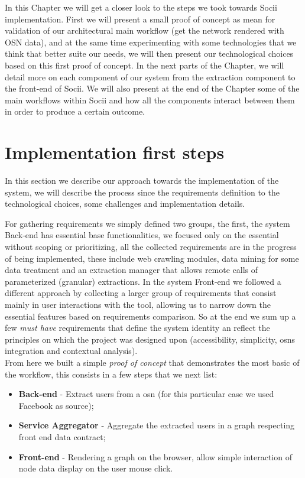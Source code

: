 In this Chapter we will get a closer look to the steps we took towards Socii implementation. First we will present a small proof of concept as mean for validation of our architectural main workflow (get the network rendered with OSN data), and at the same time experimenting with some technologies that we think that better suite our needs, we will then present our technological choices based on this first proof of concept.
\indent In the next parts of the Chapter, we will detail more on each component of our system from the extraction component to the front-end of Socii. We will also present at the end of the Chapter some of the main workflows within Socii and how all the components interact between them in order to produce a certain outcome.

\section{Implementation first steps}
In this section we describe our approach towards the implementation of the system, we will describe the process since the requirements
definition to the technological choices, some challenges and implementation details.

For gathering requirements we simply defined two groups, the first, the system Back-end has essential base functionalities, we focused only
on the essential without scoping or prioritizing, all the collected requirements are in the progress of being implemented, these include
web crawling modules, data mining for some data treatment and an extraction manager that allows remote calls of parameterized (granular) extractions.
In the system Front-end we followed a different approach by collecting a larger group of requirements that consist mainly in user interactions with the tool,
allowing us to narrow down the essential features based on requirements comparison. So at the end we sum up a few \textit{must have} requirements that
define the system identity an reflect the principles on which the project was designed upon (accessibility, simplicity, \glspl{osn} integration and contextual analysis).\\

\indent From here we built a simple \textit{proof of concept} that demonstrates the most basic of the workflow, this consists in a few steps that we next list:
\begin{itemize}
    \item \textbf{Back-end} - Extract users from a \gls{osn} (for this particular case we used Facebook as source);
    \item \textbf{Service Aggregator} - Aggregate the extracted users in a graph respecting front end data contract;
    \item \textbf{Front-end} - Rendering a graph on the browser, allow simple interaction of node data display on the user mouse click.
\end{itemize}

